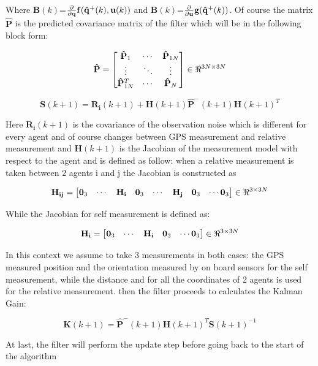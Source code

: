 \documentclass[conference]{IEEEtran}
\begin{document}
Where $\mathbf{B}(k)$=$\pdv {}{\mathbf{q}}\mathbf{f}(\mathbf{\hat{q}^{+}}(k), \mathbf{u}(k))$ and $\mathbf{B}(k)$=$\pdv {}{\mathbf{u}}\mathbf{g}(\mathbf{\hat{q}^{+}}(k))$.
Of course the matrix $\mathbf{\hat{P}}$ is the predicted covariance matrix of the filter which will be in the following block form:

$$  \mathbf{\hat{P}} =  \begin{bmatrix} \mathbf{\hat{P}}_{1}  & \cdots &\mathbf{\hat{P}}_{1N}   \\ \vdots & \ddots & \vdots \\ \mathbf{\hat{P}}_{1N}^{T} & \cdots & \mathbf{\hat{P}}_{N}   \end{bmatrix} \in \real^{3N \times 3N}$$

$$ \mathbf{S}(k+1) = \mathbf{R_{i}}(k+1) + \mathbf{H}(k+1)\mathbf{\hat{P}^{-}}(k+1)\mathbf{H}(k+1)^{T} $$

Here $\mathbf{R_{i}}(k+1)$ is the covariance of the observation noise which is different for every agent and of course changes between GPS measurement and relative measurement and $\mathbf{H}(k+1)$ is the Jacobian of the measurement model with respect to the agent and is defined as follow:
when a relative measurement is taken between 2 agents i and j the Jacobian is constructed as

$$ \mathbf{H_{ij}}=  \begin{bmatrix}\mathbf{0}_{3} & \cdots & \mathbf{H_{i}}& \mathbf{0}_{3}  & \cdots & \mathbf{H_{j}}& \mathbf{0}_{3} & \cdots \mathbf{0}_{3} \end{bmatrix} \in \real^{3 \times 3N}$$

While the Jacobian for self measurement is defined as:

$$ \mathbf{H_{i}}=  \begin{bmatrix}\mathbf{0}_{3} & \cdots & \mathbf{H_{i}}& \mathbf{0}_{3}  & \cdots \mathbf{0}_{3} \end{bmatrix}  \in \real^{3 \times 3N}$$

In this context we assume to take 3 measurements in both cases: the GPS measured position and the orientation measured by on board sensors for the self measurement, while the distance and for all the coordinates of 2 agents is used for the relative measurement.
then the filter proceeds to calculates the Kalman Gain:

$$\mathbf{K}(k+1) = \mathbf{\hat{P}^{-}}(k+1)\mathbf{H}(k+1)^{T}\mathbf{S}(k+1)^{-1}$$

At last, the filter will perform the update step before going back to the start of the algorithm
\end{document}
